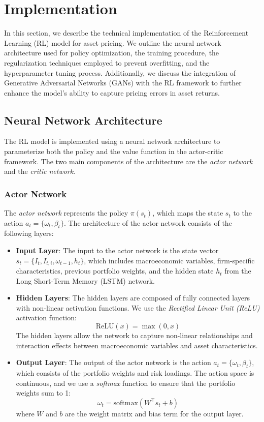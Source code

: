 \section{Implementation}

In this section, we describe the technical implementation of the Reinforcement Learning (RL) model for asset pricing. We outline the neural network architecture used for policy optimization, the training procedure, the regularization techniques employed to prevent overfitting, and the hyperparameter tuning process. Additionally, we discuss the integration of Generative Adversarial Networks (GANs) with the RL framework to further enhance the model's ability to capture pricing errors in asset returns.

\subsection{Neural Network Architecture}

The RL model is implemented using a neural network architecture to parameterize both the policy and the value function in the actor-critic framework. The two main components of the architecture are the \textit{actor network} and the \textit{critic network}.

\subsubsection{Actor Network}

The \textit{actor network} represents the policy $\pi(s_t)$, which maps the state $s_t$ to the action $a_t = \{\omega_t, \beta_t\}$. The architecture of the actor network consists of the following layers:
\begin{itemize}
    \item \textbf{Input Layer}: The input to the actor network is the state vector $s_t = \{ I_t, I_{t,i}, \omega_{t-1}, h_t \}$, which includes macroeconomic variables, firm-specific characteristics, previous portfolio weights, and the hidden state $h_t$ from the Long Short-Term Memory (LSTM) network.
    \item \textbf{Hidden Layers}: The hidden layers are composed of fully connected layers with non-linear activation functions. We use the \textit{Rectified Linear Unit (ReLU)} activation function:
    \[
    \text{ReLU}(x) = \max(0, x)
    \]
    The hidden layers allow the network to capture non-linear relationships and interaction effects between macroeconomic variables and asset characteristics.
    \item \textbf{Output Layer}: The output of the actor network is the action $a_t = \{\omega_t, \beta_t\}$, which consists of the portfolio weights and risk loadings. The action space is continuous, and we use a \textit{softmax} function to ensure that the portfolio weights sum to 1:
    \[
    \omega_t = \text{softmax}(W^\top s_t + b)
    \]
    where $W$ and $b$ are the weight matrix and bias term for the output layer.
\end{itemize}


